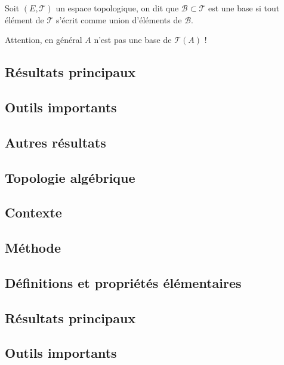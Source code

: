 \documentclass[12pt,a4paper]{article}
\begin{document}
\begin{definstar}
Soit $(E,\mathcal{T})$ un espace topologique, on dit que $\mathcal{B}\subset \mathcal{T}$ est une base si tout élément de $\mathcal{T}$ s'écrit comme union d'éléments de $\mathcal{B}$.
\end{definstar}
\begin{rmq}
Attention, en général $A$ n'est pas une base de $\mathcal{T}(A)$ !
\end{rmq}

\subsection*{Résultats principaux}

\subsection*{Outils importants}

\subsection*{Autres résultats}


\newpage
\begin{center}  
\section*{Topologie algébrique} 
\end{center}



\subsection*{Contexte}

\subsection*{Méthode}

\subsection*{Définitions et propriétés élémentaires}

\subsection*{Résultats principaux}

\subsection*{Outils importants}
\end{document}
